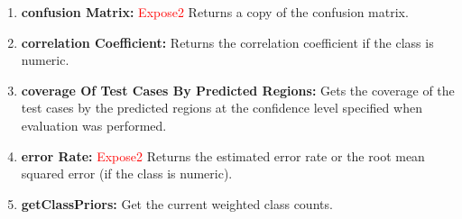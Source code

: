 \documentclass[a4paper,12pt, english]{article}
\begin{document}
\begin{enumerate}
\item \textbf{confusion Matrix: } \textcolor{red}{Expose2}
          Returns a copy of the confusion matrix.
          

          

          
\item \textbf{correlation Coefficient: }
          Returns the correlation coefficient if the class is numeric.
          
\item \textbf{coverage Of Test Cases By Predicted Regions: }
          Gets the coverage of the test cases by the predicted regions at the confidence level specified when evaluation was performed.
          

          
          
          
\item \textbf{error Rate: } \textcolor{red}{Expose2}
          Returns the estimated error rate or the root mean squared error (if the class is numeric). 

                    

\item \textbf{getClassPriors: }
          Get the current weighted class counts.
          
          

\end{enumerate}
\end{document}
